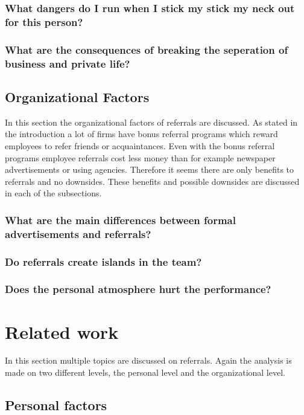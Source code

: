 \documentclass[a4paper, 11pt]{article} %
\begin{document}
\subsubsection*{What dangers do I run when I stick my stick my neck out for this person?}
\subsubsection*{What are the consequences of breaking the seperation of business and private life?}

\subsection*{Organizational Factors}

In this section the organizational factors of referrals are discussed. As stated in the introduction a lot of firms have bonus referral programs which reward employees to refer friends or acquaintances. Even with the bonus referral programs employee referrals cost less money than for example newspaper advertisements or using agencies. Therefore it seems there are only benefits to referrals and no downsides. These benefits and possible downsides are discussed in each of the subsections.

\subsubsection*{What are the main differences between formal advertisements and referrals?}
\subsubsection*{Do referrals create islands in the team?}
\subsubsection*{Does the personal atmosphere hurt the performance?}

\section*{Related work}
In this section multiple topics are discussed on referrals. Again the analysis is made on two different levels, the personal level and the organizational level. 

\subsection*{Personal factors}
\end{document}
